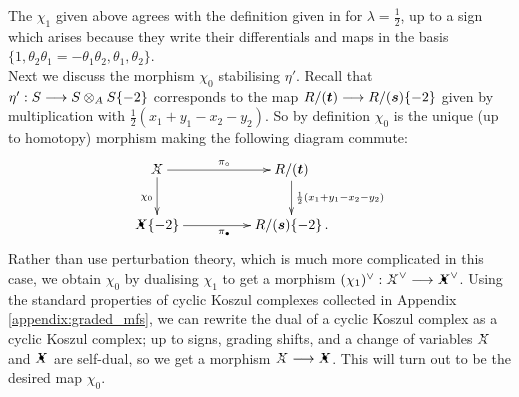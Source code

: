 \documentclass{compositio}
\theoremstyle{definition}
\numberwithin{equation}{section}
\begin{document}
The $\chi_1$ given above agrees with the definition given in \cite[p.51]{kr0401268} for $\lambda = \frac{1}{2}$, up to a sign which arises because they write their differentials and maps in the basis $\{1, \theta_2 \theta_1 = - \theta_1 \theta_2, \theta_1, \theta_2\}$.
\\

Next we discuss the morphism $\chi_0$ stabilising $\eta'$. Recall that $\eta': S \longrightarrow S \otimes_A S\{-2\}$ corresponds to the map $R/(\boldsymbol{t}) \longrightarrow R/(\boldsymbol{s})\{-2\}$ given by multiplication with $\frac{1}{2}(x_1 + y_1 - x_2 - y_2)$. So by definition $\chi_0$ is the unique (up to homotopy) morphism making the following diagram commute:
\begin{equation}\label{eq:cons50}
\xymatrix@C+2pc{
\Xcirc \ar[d]_{\chi_0} \ar[r]^{\pi_{\circ}} & R/(\boldsymbol{t}) \ar[d]^-{\frac{1}{2}(x_1+y_1-x_2-y_2)}\\
\Xbul\{-2\} \ar[r]_{\pi_{\bullet}} & R/(\boldsymbol{s})\{-2\} \, .
}
\end{equation}
Rather than use perturbation theory, which is much more complicated in this case, we obtain $\chi_0$ by dualising $\chi_1$ to get a morphism $(\chi_1)\mdual: \Xcirc\mdual \lto \Xbul\mdual$. Using the standard properties of cyclic Koszul complexes collected in Appendix \ref{appendix:graded_mfs}, we can rewrite the dual of a cyclic Koszul complex as a cyclic Koszul complex; up to signs, grading shifts, and a change of variables $\Xcirc$ and $\Xbul$ are self-dual, so we get a morphism $\Xcirc \lto \Xbul$. This will turn out to be the desired map $\chi_0$.
\end{document}
